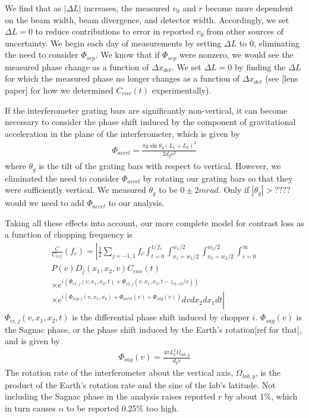 \documentclass[twocolumn, prl,showpacs,superscriptaddress]{revtex4-1}   %
\begin{document}
We find that as $\left|\Delta L\right|$ increases, the measured $v_0$ and $r$ become more dependent on the beam width, beam divergence, and detector width. Accordingly, we set $\Delta L = 0$ to reduce contributions to error in reported $v_0$ from other sources of uncertainty. We begin each day of measurements by setting $\Delta L$ to 0, eliminating the need to consider $\Phi_{sep}$. We know that if $\Phi_{sep}$ were nonzero, we would see the measured phase change as a function of $\Delta x_{det}$. We set $\Delta L = 0$ by finding the $\Delta L$ for which the measured phase no longer changes as a function of $\Delta x_{det}$ (see [lens paper] for how we determined $C_{env}(t)$ experimentally).


If the interferometer grating bars are significantly non-vertical, it can become necessary to consider the phase shift induced by the component of gravitational acceleration in the plane of the interferometer, which is given by
\begin{align}
	\Phi_{accel} = \frac{\pi g\sin{\theta_g}(L_1+L_2)^2}{2d_g v^2}
	\label{phiAccel}
\end{align}
where $\theta_g$ is the tilt of the grating bars with respect to vertical. However, we eliminated the need to consider $\Phi_{accel}$ by rotating our grating bars so that they were sufficiently vertical. We measured $\theta_g$ to be $0 \pm 2 mrad$. Only if $|\theta_g| > ????$ would we need to add $\Phi_{accel}$ to our analysis.

Taking all these effects into account, our more complete model for contrast loss as a function of chopping frequency is
\begin{align}
	\frac{C}{C_{ref}}(f_c) = 
	\left|
		\frac{1}{2} \sum_{j=-1,1}
		f_c \int_{t=0}^{1/f_c} 
		\int_{x_1=w_1/2}^{w_1/2}
		\int_{x_2=w_2/2}^{w_2/2}
		\int_{v=0}^{\infty}           
		\right. \nonumber \\
		P(v)
		D_j(x_1, x_2, v)
		C_{env}(t)                   
		\nonumber \\ \times
		e^{i( \Phi_{c1,j}(v,x_1,x_2,t) + \Phi_{c2,j}(v,x_1,x_2,t-z_{c1,c2}/v) )}
		\nonumber \\ \times \left.
		e^{i( \Phi_{sep,j}(v,x_1,x_2) + \Phi_{accel}(v) + \Phi_{sag}(v) )}
		dv dx_{2} dx_{1} dt
	\right|
	\label{CvCF}
\end{align}
$\Phi_{ci,j}(v,x_1,x_2,t)$ is the differential phase shift induced by chopper $i$. $\Phi_{sag}(v)$ is the Sagnac phase, or the phase shift induced by the Earth's rotation[ref for that], and is given by
\begin{align}
	\Phi_{sag}(v) = \frac{4\pi L_2^2\Omega_{lab,y}}{d_g v}
	\label{phiSag}
\end{align}
The rotation rate of the interferometer about the vertical axis, $\Omega_{lab,y}$, is the product of the Earth's rotation rate and the sine of the lab's latitude. Not including the Sagnac phase in the analysis raises reported $r$ by about 1\%, which in turn causes $\alpha$ to be reported 0.25\% too high.
\end{document}
